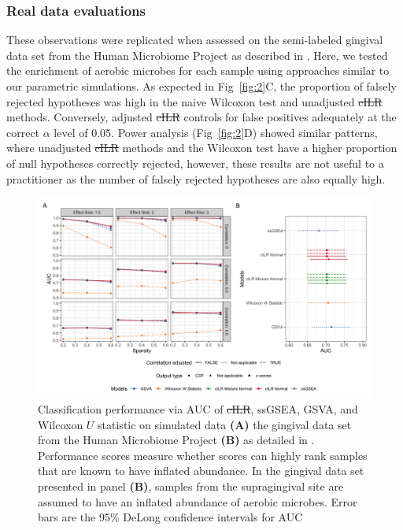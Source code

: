 \documentclass[10pt,letterpaper]{article}
\providecommand{\DIFaddtex}[1]{{\protect\color{blue}\uwave{#1}}} %
\providecommand{\DIFdeltex}[1]{{\protect\color{red}\sout{#1}}}                      %
\providecommand{\DIFaddbegin}{} %
\providecommand{\DIFaddend}{} %
\providecommand{\DIFdelbegin}{} %
\providecommand{\DIFdelend}{} %
\providecommand{\DIFaddFL}[1]{\DIFadd{#1}} %
\providecommand{\DIFdelFL}[1]{\DIFdel{#1}} %
\providecommand{\DIFaddbeginFL}{} %
\providecommand{\DIFaddendFL}{} %
\providecommand{\DIFdelbeginFL}{} %
\providecommand{\DIFdelendFL}{} %
\providecommand{\DIFadd}[1]{\texorpdfstring{\DIFaddtex{#1}}{#1}} %
\providecommand{\DIFdel}[1]{\texorpdfstring{\DIFdeltex{#1}}{}} %
\newcommand{\DIFscaledelfig}{0.5}
\newlength{\DIFdelgraphicswidth} %
\newlength{\DIFdelgraphicsheight} %
\newcommand{\DIFaddincludegraphics}[2][]{{\color{blue}\fbox{\DIFOincludegraphics[#1]{#2}}}} %
\newcommand{\DIFdelincludegraphics}[2][]{%
\sbox{\DIFdelgraphicsbox}{\DIFOincludegraphics[#1]{#2}}%
\settoboxwidth{\DIFdelgraphicswidth}{\DIFdelgraphicsbox} %
\settoboxtotalheight{\DIFdelgraphicsheight}{\DIFdelgraphicsbox} %
\scalebox{\DIFscaledelfig}{%
\parbox[b]{\DIFdelgraphicswidth}{\usebox{\DIFdelgraphicsbox}\\[-\baselineskip] \rule{\DIFdelgraphicswidth}{0em}}\llap{\resizebox{\DIFdelgraphicswidth}{\DIFdelgraphicsheight}{%
\setlength{\unitlength}{\DIFdelgraphicswidth}%
\begin{picture}(1,1)%
\thicklines\linethickness{2pt} %
{\color[rgb]{1,0,0}\put(0,0){\framebox(1,1){}}}%
{\color[rgb]{1,0,0}\put(0,0){\line( 1,1){1}}}%
{\color[rgb]{1,0,0}\put(0,1){\line(1,-1){1}}}%
\end{picture}%
}\hspace*{3pt}}} %
} %
\DeclareRobustCommand{\DIFaddbegin}{\DIFOaddbegin \let\includegraphics\DIFaddincludegraphics} %
\DeclareRobustCommand{\DIFaddend}{\DIFOaddend \let\includegraphics\DIFOincludegraphics} %
\DeclareRobustCommand{\DIFdelbegin}{\DIFOdelbegin \let\includegraphics\DIFdelincludegraphics} %
\DeclareRobustCommand{\DIFdelend}{\DIFOaddend \let\includegraphics\DIFOincludegraphics} %
\DeclareRobustCommand{\DIFaddbeginFL}{\DIFOaddbeginFL \let\includegraphics\DIFaddincludegraphics} %
\DeclareRobustCommand{\DIFaddendFL}{\DIFOaddendFL \let\includegraphics\DIFOincludegraphics} %
\DeclareRobustCommand{\DIFdelbeginFL}{\DIFOdelbeginFL \let\includegraphics\DIFdelincludegraphics} %
\DeclareRobustCommand{\DIFdelendFL}{\DIFOaddendFL \let\includegraphics\DIFOincludegraphics} %
\begin{document}
\subsubsection*{Real data evaluations}  
These observations were replicated when assessed on the semi-labeled gingival data set from the Human Microbiome Project as described in . Here, we tested the enrichment of aerobic microbes for each sample using approaches similar to our parametric simulations. As expected in Fig~\ref{fig:2}C, the proportion of falsely rejected hypotheses was high in the naive Wilcoxon test and unadjusted \DIFdelbegin \DIFdel{cILR }\DIFdelend \DIFaddbegin \DIFadd{CBEA }\DIFaddend methods. Conversely, adjusted \DIFdelbegin \DIFdel{cILR }\DIFdelend \DIFaddbegin \DIFadd{CBEA }\DIFaddend controls for false positives adequately at the correct $\alpha$ level of 0.05. Power analysis (Fig~\ref{fig:2}D) showed similar patterns, where unadjusted \DIFdelbegin \DIFdel{cILR }\DIFdelend \DIFaddbegin \DIFadd{CBEA }\DIFaddend methods and the Wilcoxon test have a higher proportion of null hypotheses correctly rejected, however, these results are not useful to a practitioner as the number of falsely rejected hypotheses are also equally high.  

\begin{figure}[!h]
    \centering
    \includegraphics[width = \textwidth]{figures/sim_data_ss_auc.png}
    \caption{Classification performance via AUC of \DIFdelbeginFL \DIFdelFL{cILR}\DIFdelendFL \DIFaddbeginFL \DIFaddFL{CBEA}\DIFaddendFL , ssGSEA, GSVA, and Wilcoxon $U$ statistic on simulated data \textbf{(A)} the gingival data set from the Human Microbiome Project  \textbf{(B)} as detailed in . Performance scores measure whether scores can highly rank samples that are known to have inflated abundance. In the gingival data set presented in panel \textbf{(B)}, samples from the supragingival site are assumed to have an inflated abundance of aerobic microbes. Error bars are the 95\% DeLong confidence intervals for AUC \cite{delong1988}} 
    \label{fig:3}
\end{figure}
\end{document}
